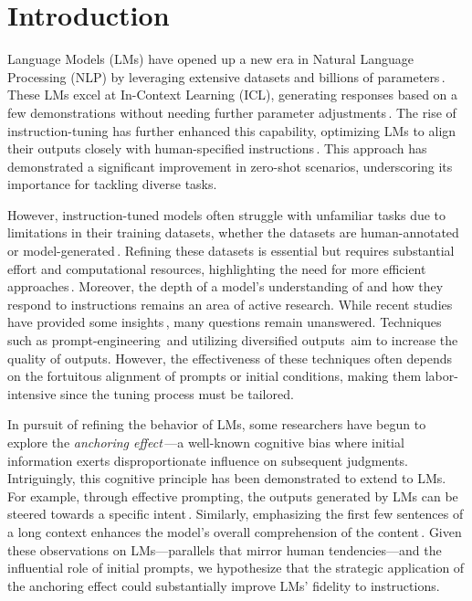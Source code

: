 \section{Introduction}
\label{sec1:introduction}
\vspace{-5pt}

Language Models (LMs) have opened up a new era in Natural Language Processing (NLP) by leveraging extensive datasets and billions of parameters\,\citep{llm_survey, gpt4_report, scaling_law}. These LMs excel at In-Context Learning (ICL), generating responses based on a few demonstrations without needing further parameter adjustments\,\citep{emergent_abilities_llms, gpt3, icl_survey}. The rise of instruction-tuning has further enhanced this capability, optimizing LMs to align their outputs closely with human-specified instructions\,\citep{flan, t0, gpt3, lms_are_unsupervised_multitask_learners}. This approach has demonstrated a significant improvement in zero-shot scenarios, underscoring its importance for tackling diverse tasks.

However, instruction-tuned models often struggle with unfamiliar tasks due to limitations in their training datasets, whether the datasets are human-annotated\,\citep{ni_dataset, sni_dataset} or model-generated\,\citep{self_instruct, unnatural_ni_dataset}. Refining these datasets is essential but requires substantial effort and computational resources, highlighting the need for more efficient approaches\,\citep{flan_t5, lima}. Moreover, the depth of a model's understanding of and how they respond to instructions remains an area of active research. While recent studies have provided some insights\,\citep{do_really_follows_instructions, did_you_read_instructions}, many questions remain unanswered. Techniques such as prompt-engineering\,\citep{prompt_analysis} and utilizing diversified outputs\,\citep{self_consistency} aim to increase the quality of outputs. However, the effectiveness of these techniques often depends on the fortuitous alignment of prompts or initial conditions, making them labor-intensive since the tuning process must be tailored.

In pursuit of refining the behavior of LMs, some researchers have begun to explore the \textit{anchoring effect}\,\citep{kahneman1982judgment}—a well-known cognitive bias where initial information exerts disproportionate influence on subsequent judgments. Intriguingly, this cognitive principle has been demonstrated to extend to LMs. For example, through effective prompting, the outputs generated by LMs can be steered towards a specific intent\,\citep{jones2022capturing}. Similarly, emphasizing the first few sentences of a long context enhances the model's overall comprehension of the content\,\citep{coherence_boosting}. Given these observations on LMs—parallels that mirror human tendencies—and the influential role of initial prompts, we hypothesize that the strategic application of the anchoring effect could substantially improve LMs' fidelity to instructions.

